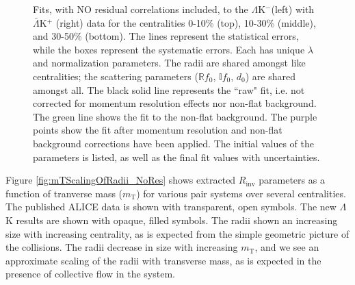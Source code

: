 \documentclass[../AnalysisNoteJBuxton.tex]{subfiles}
\renewcommand{\ResNum}{_NoRes}
\renewcommand{\SaveNameModLamKch}{\MomRes\NonFlatBgd\ResNum\ParamFixAndShareLamKch}
\begin{document}
\begin{landscape}
\begin{figure}[h]
  \centering
  \caption[$\Lambda$K$^{-}$($\bar{\Lambda}$K$^{+}$) Fits with No Residuals]{Fits, with NO residual correlations included, to the $\Lambda$K$^{-}$(left) with $\bar{\Lambda}$K$^{+}$ (right) data for the centralities 0-10\% (top), 10-30\% (middle), and 30-50\% (bottom).
The lines represent the statistical errors, while the boxes represent the systematic errors.  
Each has unique $\lambda$ and normalization parameters.
The radii are shared amongst like centralities; the scattering parameters ($\mathbb{R}f_{0}$, $\mathbb{I}f_{0}$, $d_{0}$) are shared amongst all.
The black solid line represents the ``raw" fit, i.e. not corrected for momentum resolution effects nor non-flat background.  
The green line shows the fit to the non-flat background.
The purple points show the fit after momentum resolution and non-flat background corrections have been applied.
The initial values of the parameters is listed, as well as the final fit values with uncertainties.}
  \label{fig:LamKchMwConjFits_NoRes}
\end{figure}

\end{landscape}
\pagestyle{plain}




 

Figure \ref{fig:mTScalingOfRadii_NoRes} shows extracted $R_{\mathrm{inv}}$ parameters as a function of tranverse mass ($m_{\mathrm{T}}$) for various pair systems over several centralities.  The published ALICE data \cite{Adam:2015vja} is shown with transparent, open symbols.  The new $\Lambda$K results are shown with opaque, filled symbols.  The radii shown an increasing size with increasing centrality, as is expected from the simple geometric picture of the collisions.  The radii decrease in size with increasing $m_{\mathrm{T}}$, and we see an approximate scaling of the radii with transverse mass, as is expected in the presence of collective flow in the system.
\end{document}
